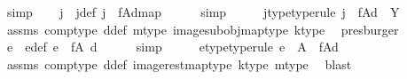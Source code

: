 \begin{isabellebody}
\ simp\isanewline
\isanewline
\ \ \isamarkupfalse%
\ j\ \ j{\isacharunderscore}{\kern0pt}def{\isacharcolon}{\kern0pt}\ {\isachardoublequoteopen}j\ {\isacharequal}{\kern0pt}\ {\isacharbrackleft}{\kern0pt}f{\isasymlparr}A{\isasymrparr}\isactrlbsub d\isactrlesub {\isacharbrackright}{\kern0pt}map{\isachardoublequoteclose}\isanewline
\ \ \ \ \isamarkupfalse%
\ simp\isanewline
\ \ \isamarkupfalse%
\ \isamarkupfalse%
\ j{\isacharunderscore}{\kern0pt}type{\isacharbrackleft}{\kern0pt}type{\isacharunderscore}{\kern0pt}rule{\isacharbrackright}{\kern0pt}{\isacharcolon}{\kern0pt}\ {\isachardoublequoteopen}j\ {\isacharcolon}{\kern0pt}\ f{\isasymlparr}A{\isasymrparr}\isactrlbsub d\isactrlesub \ {\isasymrightarrow}\ Y{\isachardoublequoteclose}\isanewline
\ \ \ \ \isamarkupfalse%
\ assms{\isacharparenleft}{\kern0pt}{}{\isacharparenright}{\kern0pt}\ comp{\isacharunderscore}{\kern0pt}type\ d{\isacharunderscore}{\kern0pt}def\ m{\isacharprime}{\kern0pt}{\isacharunderscore}{\kern0pt}type\ image{\isacharunderscore}{\kern0pt}subobj{\isacharunderscore}{\kern0pt}map{\isacharunderscore}{\kern0pt}type\ k{\isacharunderscore}{\kern0pt}type\ \isamarkupfalse%
\ presburger\isanewline
\isanewline
\ \ \isamarkupfalse%
\ e\ \ e{\isacharunderscore}{\kern0pt}def{\isacharcolon}{\kern0pt}\ {\isachardoublequoteopen}e\ {\isacharequal}{\kern0pt}\ f{\isasymrestriction}\isactrlbsub {\isacharparenleft}{\kern0pt}A{\isacharcomma}{\kern0pt}\ d{\isacharparenright}{\kern0pt}\isactrlesub {\isachardoublequoteclose}\isanewline
\ \ \ \ \isamarkupfalse%
\ simp\isanewline
\ \ \isamarkupfalse%
\ \isamarkupfalse%
\ e{\isacharunderscore}{\kern0pt}type{\isacharbrackleft}{\kern0pt}type{\isacharunderscore}{\kern0pt}rule{\isacharbrackright}{\kern0pt}{\isacharcolon}{\kern0pt}\ {\isachardoublequoteopen}e\ {\isacharcolon}{\kern0pt}\ A\ {\isasymrightarrow}\ f{\isasymlparr}A{\isasymrparr}\isactrlbsub d\isactrlesub {\isachardoublequoteclose}\isanewline
\ \ \ \ \isamarkupfalse%
\ assms{\isacharparenleft}{\kern0pt}{}{\isacharparenright}{\kern0pt}\ comp{\isacharunderscore}{\kern0pt}type\ d{\isacharunderscore}{\kern0pt}def\ image{\isacharunderscore}{\kern0pt}rest{\isacharunderscore}{\kern0pt}map{\isacharunderscore}{\kern0pt}type\ k{\isacharunderscore}{\kern0pt}type\ m{\isacharprime}{\kern0pt}{\isacharunderscore}{\kern0pt}type\ \isamarkupfalse%
\ blast\isanewline
\isanewline

\end{isabellebody}
